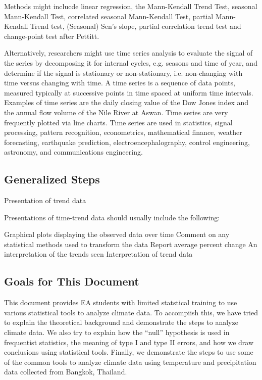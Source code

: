 \documentclass{article}\usepackage[]{graphicx}\usepackage[]{color}
\begin{document}
Methods might inclucde linear regression, the Mann-Kendall Trend Test, seasonal Mann-Kendall Test, correlated seasonal Mann-Kendall Test, partial Mann-Kendall Trend test, (Seasonal) Sen's slope, partial correlation trend test and change-point test after Pettitt.

Alternatively, researchers might use time series analysis to evaluate the signal of the series by decomposing it for internal cycles, e.g. seasons and time of year, and determine if the signal is stationary or non-stationary, i.e. non-changing with time versus changing with time. A time series is a sequence of data points, measured typically at successive points in time spaced at uniform time intervals. Examples of time series are the daily closing value of the Dow Jones index and the annual flow volume of the Nile River at Aswan. Time series are very frequently plotted via line charts. Time series are used in statistics, signal processing, pattern recognition, econometrics, mathematical finance, weather forecasting, earthquake prediction, electroencephalography, control engineering, astronomy, and communications engineering.

\subsection{Generalized Steps}

Presentation of trend data

Presentations of time-trend data should usually include the following:

Graphical plots displaying the observed data over time
Comment on any statistical methods used to transform the data
Report average percent change
An interpretation of the trends seen
Interpretation of trend data


\subsection{Goals for This Document}

This document provides EA students with limited statstical training to use various statistical tools to analyze climate data. To accompiish this, we have tried to explain the theoretical background and demonstrate the steps to analyze climate data. We also try to explain how the ``null'' hypothesis is used in frequentist statistics, the meaning of type I and type II errors, and how we draw conclusions using statistical tools. Finally, we demonstrate the steps to use some of the common tools to analyze climate data using temperature and precipitation data collected from Bangkok, Thailand. 
\end{document}
